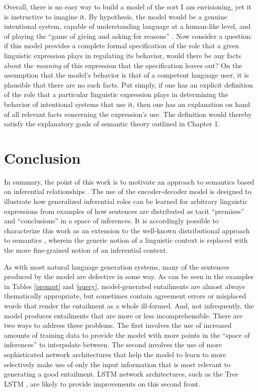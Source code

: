 Overall, there is no easy way to build a model of the sort I am envisioning, yet it is instructive to imagine it. By hypothesis, the model would be a genuine intentional system, capable of understanding language at a human-like level, and of playing the ``game of giving and asking for reasons'' \citep[][p. 23]{Brandom:1994}. Now consider a question: if this model provides a complete formal specification of the role that a given linguistic expression plays in regulating its behavior, would there be any facts about the \textit{meaning} of this expression that the specification leaves out? On the assumption that the model's behavior is that of a competent language user, it is plausible that there are no such facts. Put simply, if one has an explicit definition of the role that a particular linguistic expression plays in determining the behavior of intentional systems that use it, then one has an explanation on hand of all relevant facts concerning the expression's use. The definition would thereby satisfy the explanatory goals of semantic theory outlined in Chapter 1. 

\section{Conclusion}

In summary, the point of this work is to motivate an approach to semantics based on inferential relationships \citep{Brandom:1994}. The use of the encoder-decoder model is designed to illustrate how generalized inferential roles can be learned for arbitrary linguistic expressions from examples of how sentences are distributed as tacit ``premises'' and ``conclusions'' in a space of inferences. It is accordingly possible to characterize this work as an extension to the well-known distributional approach to semantics \citep{TurneyPantel:2010}, wherein the generic notion of a linguistic context is replaced with the more fine-grained notion of an inferential context. 

As with most natural language generation systems, many of the sentences produced by the model are defective in some way. As can be seen in the examples in Tables \ref{prompt} and \ref{query}, model-generated entailments are almost always thematically appropriate, but sometimes contain agreement errors or misplaced words that render the entailment as a whole ill-formed. And, not infrequently, the model produces entailments that are more or less incomprehensible. There are two ways to address these problems. The first involves the use of increased amounts of training data to provide the model with more points in the ``space of inferences'' to interpolate between. The second involves the use of more sophisticated network architectures that help the model to learn to more selectively make use of only the input information that is most relevant to generating a good entailment. LSTM network architectures, such as the Tree LSTM \citep{Tai:2015}, are likely to provide improvements on this second front. 

